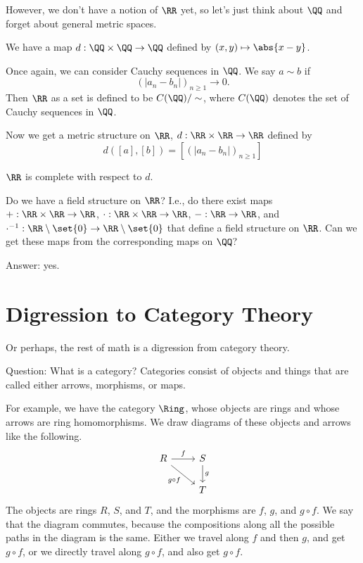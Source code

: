 \documentclass{article}
\begin{document}
However, we don't have a notion of $\RR$ yet, so let's just 
think about $\QQ$ and forget about general metric spaces. 

We have a map $d:\QQ\times \QQ\to \QQ$ defined by 
$(x,y)\mapsto \abs{x-y}$.

Once again, we can consider Cauchy sequences in $\QQ$.
We say $a\sim b$ if \[ (|a_n-b_n|)_{n\ge 1} \to 0. \]
Then $\RR$ as a set is defined to be $C(\QQ)/\sim$, where 
$C(\QQ)$ denotes the set of Cauchy sequences in $\QQ$.

Now we get a metric structure on $\RR$, $d:\RR\times \RR\to \RR$
defined by 
\[ d([a],[b]) = [(|a_n-b_n|)_{n\ge 1}] \]

    $\RR$ is complete with respect to $d$.

Do we have a field structure on $\RR$?
I.e., do there exist maps $+:\RR\times \RR\to\RR$, 
$\cdot : \RR\times \RR\to \RR$, $- : \RR\to\RR$,
and $\cdot ^{-1} : \RR\setminus\set{0} \to \RR\setminus\set{0}$
that define a field structure on $\RR$.
Can we get these maps from the corresponding maps on $\QQ$?

Answer: yes.

\section{Digression to Category Theory}

Or perhaps, the rest of math is a digression from category theory.

Question: What is a category?
Categories consist of objects and things that are 
called either arrows, morphisms, or maps.

For example, we have the category $\Ring$, whose objects 
are rings and whose arrows are ring homomorphisms.
We draw diagrams of these objects and arrows like the following.
\[ 
\begin{tikzcd}
R \arrow[rd, "g\circ f"'] \arrow[r, "f"] & S \arrow[d, "g"] \\
                                         & T               
\end{tikzcd}
\]
The objects are rings $R$, $S$, and $T$, and the morphisms 
are $f$, $g$, and $g\circ f$. We say that the diagram commutes,
because the compositions along all the possible paths in the 
diagram is the same. Either we travel along $f$ and then $g$,
and get $g\circ f$, or we directly travel along $g\circ f$,
and also get $g\circ f$.
\end{document}
